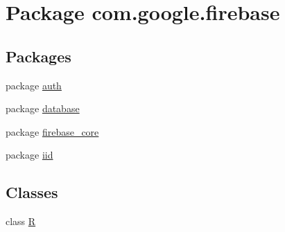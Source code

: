 \hypertarget{namespacecom_1_1google_1_1firebase}{}\section{Package com.\+google.\+firebase}
\label{namespacecom_1_1google_1_1firebase}
\subsection*{Packages}
\begin{DoxyCompactItemize}
\item 
package \mbox{\hyperlink{namespacecom_1_1google_1_1firebase_1_1auth}{auth}}
\item 
package \mbox{\hyperlink{namespacecom_1_1google_1_1firebase_1_1database}{database}}
\item 
package \mbox{\hyperlink{namespacecom_1_1google_1_1firebase_1_1firebase__core}{firebase\+\_\+core}}
\item 
package \mbox{\hyperlink{namespacecom_1_1google_1_1firebase_1_1iid}{iid}}
\end{DoxyCompactItemize}
\subsection*{Classes}
\begin{DoxyCompactItemize}
\item 
class \mbox{\hyperlink{classcom_1_1google_1_1firebase_1_1R}{R}}
\end{DoxyCompactItemize}
